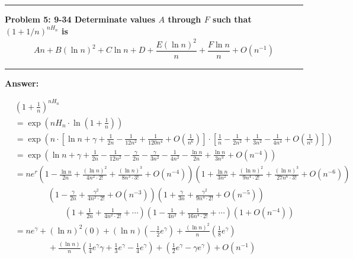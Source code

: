\documentclass[11pt,fleqn]{article}
\newcommand\question[2]{\vspace{.25in}\hrule\textbf{#1: #2}\vspace{.5em}\hrule\vspace{.10in}}
\renewcommand\part[1]{\vspace{.10in}\textbf{#1}}
\begin{document}
\newpage

\question{Problem 5} {9-34 Determinate values $A$ through $F$ such that $(1+1/n)^{n H_n}$ 
	is
	\begin{align*}
		An + B(\ln n)^2 + C \ln n + D + \dfrac{E(\ln n)^2}{n} + \dfrac{F \ln n}{n} + O(n^{-1})
	\end{align*}
}

\part{Answer:}

\begin{align*}
	& \left(1 + \frac{1}{n} \right)^{n H_n} \\
		&= \exp\left(n H_n \cdot \ln\left( 1 + \frac{1}{n} \right) \right) \\
		&= \exp\left(n \cdot 
			\left[ \ln n + \gamma + \frac{1}{2n} - \frac{1}{12n^2} + \frac{1}{120n^4} + O(\frac{1}{n^6}) \right] \cdot 
			\left[ \frac{1}{n} - \frac{1}{2n^2} + \frac{1}{3n^2} - \frac{1}{4n^4} + O(\frac{1}{n^5}) \right]
			\right) \\
		&= \exp\left( \ln n + \gamma + \frac{1}{2n} - \frac{1}{12n^2} 
				- \frac{\gamma}{2n} - \frac{\gamma}{3n^2} - \frac{1}{4n^2}
				- \frac{\ln n}{2n} + \frac{\ln n}{3n^3} + O(n^{-4})\right) \\
		&= n e^r \left(1 - \frac{\ln n}{2n} + \frac{(\ln n)^2}{4n^2\cdot 2!}
					+ \frac{(\ln n)^3}{8n^3\cdot 3!} + O(n^{-4}) \right)
			\left(1 + \frac{\ln n}{3n^2} + \frac{(\ln n)^2}{9n^4\cdot 2!}
					+ \frac{(\ln n)^3}{27n^6\cdot 3!} + O(n^{-6}) \right) \\
		&	\qquad \qquad 
			\left(1 - \frac{\gamma}{2n} + \frac{\gamma^2}{4n^2\cdot 2!} + O(n^{-3}) \right) 
			\left(1 + \frac{\gamma}{3n} + \frac{\gamma^2}{9n^4\cdot 2!} + O(n^{-5}) \right) \\
		&	\qquad \qquad \qquad 
			\left(1 + \frac{1}{2n} + \frac{1}{4n^2 \cdot 2!} + \cdots \right)
			\left(1 - \frac{1}{4n^2} + \frac{1}{16n^4 \cdot 2!} + \cdots \right) 
			\left(1 + O(n^{-4})\right)\\
		&= ne^\gamma + \left(\ln n\right)^2 (0) + 
			\left(\ln n\right) \left(-\frac{1}{2}e^\gamma\right) 
			+ \frac{\left(\ln n\right)^2}{n} \left(\frac{1}{8} e^\gamma\right) \\
		&	\qquad \qquad
			+ \frac{\left(\ln n\right)}{n} 
				\left(\frac{1}{4} e^\gamma \gamma + \frac{1}{3} e^\gamma 
				- \frac{1}{4} e^\gamma\right)
			+ \left(\frac{1}{2} e^\gamma - \gamma e^\gamma \right) + O(n^{-1})
\end{align*}
\end{document}
